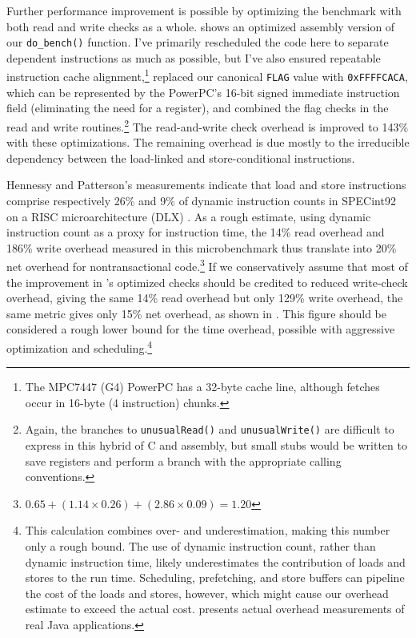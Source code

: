 Further performance improvement is possible by optimizing the
benchmark with both read and write checks as a whole. 
shows an
optimized assembly version of our \texttt{do\_bench()} function.  I've
primarily rescheduled the code here to separate dependent instructions
as much as possible, but I've also ensured repeatable instruction
cache alignment,\footnote{The MPC7447 (G4) PowerPC has a 32-byte cache
  line, although fetches occur in 16-byte (4 instruction) chunks.}
replaced our canonical \texttt{FLAG} value with
\texttt{0xFFFFCACA}, which can be represented by the PowerPC's 16-bit
signed immediate instruction field (eliminating the need for a
register), and combined the flag checks in
the read and write routines.\footnote{Again, the branches to
\texttt{unusualRead()} and 
\texttt{unusualWrite()} are difficult to express in this hybrid of C
and assembly, but small stubs would be written to save registers and
perform a branch with the appropriate calling conventions.}
The read-and-write check overhead is improved to 143\% with these
optimizations.  The remaining overhead is
due mostly to the irreducible dependency between the
load-linked and store-conditional instructions.


Hennessy and Patterson's measurements indicate that load and store
instructions comprise respectively 26\% and 9\% of dynamic instruction
counts in SPECint92 on a RISC microarchitecture (DLX)
\cite[p. 105]{HennessyPa96}.
As a rough estimate, using dynamic instruction count as a proxy for
instruction time,
the 14\% read overhead and 186\% write overhead measured
in this microbenchmark thus translate into 20\% net overhead for
nontransactional code.\footnote{$0.65 + (1.14 \times 0.26) + (2.86
  \times 0.09) = 1.20$} If we conservatively assume that most of the
improvement in 's optimized checks should be credited
to reduced write-check overhead, giving the same 14\% read overhead
but only 129\% write overhead, the same metric gives only 15\% net
overhead, as shown in .  This figure should be
considered a rough lower bound for the time overhead, possible with
aggressive optimization and scheduling.\footnote{This
  calculation combines over- and underestimation, making this number
  only a rough bound.  The use of dynamic instruction count, rather
  than dynamic instruction time, likely underestimates the
  contribution of loads and stores to the run time.
  Scheduling, prefetching, and store buffers can pipeline the cost of
  the loads and stores, however, which might cause our overhead estimate to
  exceed the actual cost.   presents actual
  overhead measurements of real Java applications.}

